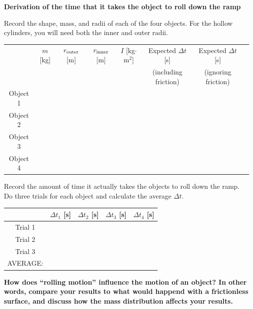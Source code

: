 \documentclass[11pt,letterpaper]{article}
\begin{document}
{\bf Derivation of the time that it takes the object to roll down the ramp}

\clearpage

Record the shape, mass, and radii of each of the four objects. For the hollow cylinders, you will need both the inner and outer radii.

\begin{table}[h!]
\begin{tabular}{|c|c|c|c|c|c|c|c|}
\hline
& $m$ [kg] & $r_{\rm outer}$ [m] & $r_{\rm inner}$ [m] & $I$ [kg$\cdot$m$^2$] & Expected $\Delta{t}$ [s] & Expected $\Delta{t}$ [s]\\
& & & & & (including friction) & (ignoring friction)\\
\hline Object 1 & \hspace{1.5cm} & \hspace{1.5cm} & \hspace{1.5cm} & \hspace{1.5cm} & \hspace{1.5cm} & \hspace{1.5cm} \\
\hline Object 2 & & & & & & \\
\hline Object 3 & & & & & & \\
\hline Object 4 & & & & & & \\
\hline
\end{tabular}
\end{table}

Record the amount of time it actually takes the objects to roll down the ramp. Do three trials for each object and calculate the average $\Delta{t}$.
\begin{table}[h!]
\begin{tabular}{|c|c|c|c|c|}
\hline & $\Delta{t_1}$ [s] & $\Delta{t_2}$  [s] & $\Delta{t_3}$ [s] & $\Delta{t_4}$  [s] \\
\hline Trial 1 & \hspace{3cm} &\hspace{3cm} & \hspace{3cm} & \hspace{3cm} \\
\hline Trial 2 & & & & \\
\hline Trial 3 & & & & \\
\hline\hline AVERAGE: & & & & \\
\hline
\end{tabular}
\end{table}


{\bf How does ``rolling motion'' influence the motion of an object? In other words, compare your results to what would happend with a frictionless surface, and discuss how the mass distribution affects your results. }
\end{document}
